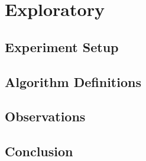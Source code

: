 \chapter{Exploratory}
\section{Experiment Setup}
\section{Algorithm Definitions}
\section{Observations}
\section{Conclusion}